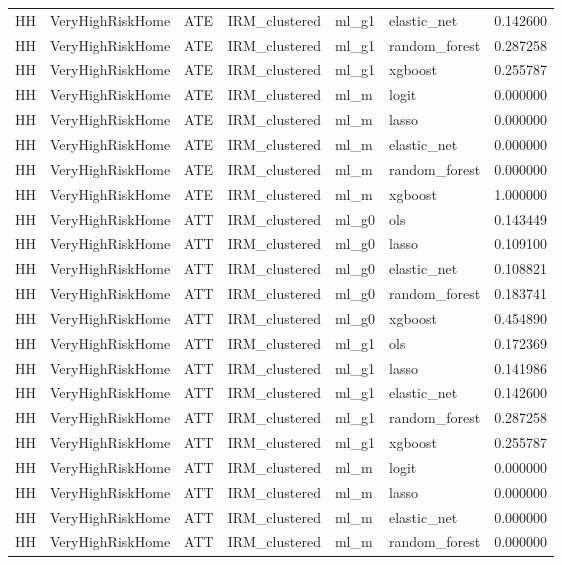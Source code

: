 \begin{longtable}{llllllr}
HH & VeryHighRiskHome & ATE & IRM\_clustered & ml\_g1 & elastic\_net & 0.142600 \\
HH & VeryHighRiskHome & ATE & IRM\_clustered & ml\_g1 & random\_forest & 0.287258 \\
HH & VeryHighRiskHome & ATE & IRM\_clustered & ml\_g1 & xgboost & 0.255787 \\
HH & VeryHighRiskHome & ATE & IRM\_clustered & ml\_m & logit & 0.000000 \\
HH & VeryHighRiskHome & ATE & IRM\_clustered & ml\_m & lasso & 0.000000 \\
HH & VeryHighRiskHome & ATE & IRM\_clustered & ml\_m & elastic\_net & 0.000000 \\
HH & VeryHighRiskHome & ATE & IRM\_clustered & ml\_m & random\_forest & 0.000000 \\
HH & VeryHighRiskHome & ATE & IRM\_clustered & ml\_m & xgboost & 1.000000 \\
HH & VeryHighRiskHome & ATT & IRM\_clustered & ml\_g0 & ols & 0.143449 \\
HH & VeryHighRiskHome & ATT & IRM\_clustered & ml\_g0 & lasso & 0.109100 \\
HH & VeryHighRiskHome & ATT & IRM\_clustered & ml\_g0 & elastic\_net & 0.108821 \\
HH & VeryHighRiskHome & ATT & IRM\_clustered & ml\_g0 & random\_forest & 0.183741 \\
HH & VeryHighRiskHome & ATT & IRM\_clustered & ml\_g0 & xgboost & 0.454890 \\
HH & VeryHighRiskHome & ATT & IRM\_clustered & ml\_g1 & ols & 0.172369 \\
HH & VeryHighRiskHome & ATT & IRM\_clustered & ml\_g1 & lasso & 0.141986 \\
HH & VeryHighRiskHome & ATT & IRM\_clustered & ml\_g1 & elastic\_net & 0.142600 \\
HH & VeryHighRiskHome & ATT & IRM\_clustered & ml\_g1 & random\_forest & 0.287258 \\
HH & VeryHighRiskHome & ATT & IRM\_clustered & ml\_g1 & xgboost & 0.255787 \\
HH & VeryHighRiskHome & ATT & IRM\_clustered & ml\_m & logit & 0.000000 \\
HH & VeryHighRiskHome & ATT & IRM\_clustered & ml\_m & lasso & 0.000000 \\
HH & VeryHighRiskHome & ATT & IRM\_clustered & ml\_m & elastic\_net & 0.000000 \\
HH & VeryHighRiskHome & ATT & IRM\_clustered & ml\_m & random\_forest & 0.000000 \\

\end{longtable}

